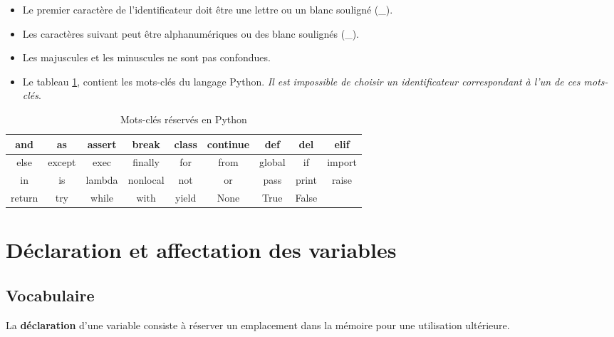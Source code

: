 \documentclass{article}
\newcommand{\tmem}[1]{{\em #1\/}}
\newcommand{\tmtextbf}[1]{{\bfseries{#1}}}
\newenvironment{itemizeminus}{\begin{itemize} \renewcommand{\labelitemi}{$-$}\renewcommand{\labelitemii}{$-$}\renewcommand{\labelitemiii}{$-$}\renewcommand{\labelitemiv}{$-$}}{\end{itemize}}
\begin{document}
\begin{itemizeminus}
  \item Le premier caractère de l'identificateur doit être une lettre ou un
  blanc souligné ({\hspace{0.17em}}\_{\hspace{0.17em}}).
  
  \item Les caractères suivant peut être alphanumériques ou des blanc
  soulignés ({\hspace{0.17em}}\_{\hspace{0.17em}}).
  
  \item Les majuscules et les minuscules ne sont pas confondues.
  
  \item Le tableau \ref{table:02}, contient les mots-clés du langage Python.
  {\tmem{Il est impossible de choisir un identificateur correspondant à l'un
  de ces mots-clés}}.
\end{itemizeminus}
\begin{table}[h]
  \begin{center}
    \begin{tabular}{ccccccccc}
      \hline
      and & as & assert & break & class & continue & def & del & elif\\
      \hline
      else & except & exec & finally & for & from & global & if & import\\
      \hline
      in & is & lambda & nonlocal & not & or & pass & print & raise\\
      \hline
      return & try & while & with & yield & None & True & False & \\
      \hline
    \end{tabular} 
  \end{center}
  \caption{Mots-clés réservés en Python\label{table:02}}
\end{table}

\section{Déclaration et affectation des variables}

\subsection{Vocabulaire}

\begin{tmornamented}[roundcorner=1.7ex]
  La \tmtextbf{déclaration} d'une variable consiste à réserver un
  emplacement dans la mémoire pour une utilisation ultérieure.
\end{tmornamented}
\end{document}
